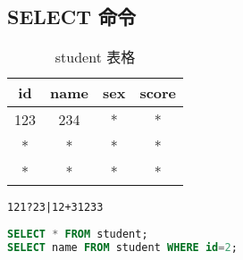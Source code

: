 
\begin{issues}
\issueDraft
\end{issues}

\subsection{SELECT 命令}

\begin{table}[ht]
\centering
\caption{student 表格}\label{tab_SQLgrm_1}
\begin{tabular}{|c|c|c|c|}
\hline
id & name & sex & score \\
\hline
123 & 234 & * & * \\
\hline
* & * & * & * \\
\hline
* & * & * & * \\
\hline
\end{tabular}
\end{table}

\verb`121?23|12+31233`

\begin{lstlisting}[language=sql]
SELECT * FROM student;
SELECT name FROM student WHERE id=2;
\end{lstlisting}
